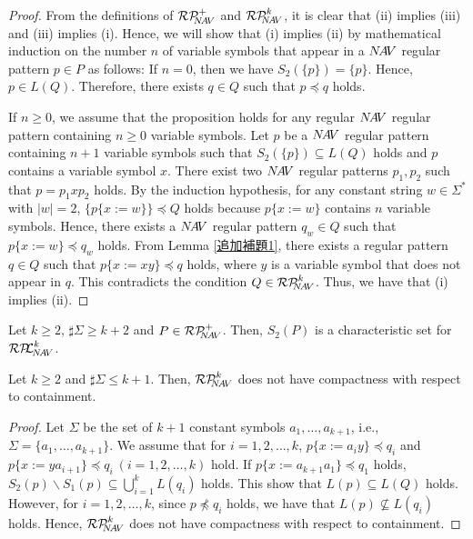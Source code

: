 \begin{proof}
From the definitions of $\mathcal{RP}^{+}_{\!\!\!N\!A\!V}$ and $\mathcal{RP}^{k}_{\!\!\!N\!A\!V}$, it is clear that (ii) implies (iii)  and  (iii) implies (i).
Hence, we will show that (i) implies (ii) 
by mathematical induction on the number $n$ of variable symbols that appear in a $N\!A\!V$ regular pattern $p\in P$ as follows:
If $n=0$, then we have $S_{2}(\{p\})= \{ p \}$.
Hence, $p \in L(Q)$.
Therefore, there exists $q \in Q$ such that $p \preceq q$ holds.

If $n \ge 0$, we assume that the proposition holds for any regular $N\!A\!V$ regular pattern containing $n \ge 0$ variable symbols.
Let $p$ be a $N\!A\!V$ regular pattern containing $n+1$ variable symbols such that $S_{2}(\{p\}) \subseteq L(Q)$ holds and $p$ contains a variable symbol $x$.
There exist two $N\!A\!V$ regular patterns $p_{1},p_{2}$ such that $p=p_{1}xp_{2}$ holds.
By the induction hypothesis, for any constant string $w\in \Sigma^{\ast}$ with $|w|=2$, $\{p\{x:=w\}\}\preceq Q$ holds because $p\{x:=w\}$ contains $n$ variable symbols.
Hence, there exists a $N\!A\!V$ regular pattern $q_{w} \in Q$ such that $p \{ x:=w \} \preceq q_{w}$ holds.
From Lemma \ref{追加補題1}, there exists a regular pattern $q \in Q$ such that $p \{ x:=xy \} \preceq q$ holds, where $y$ is a variable symbol that does not appear in $q$.
This contradicts the condition $Q \in \mathcal{RP}^{k}_{\!\!\!N\!A\!V}$.
Thus, we have that (i) implies (ii).
\end{proof}

\begin{col}
Let $k\ge 2$, $\sharp\Sigma \ge k+2$ and $P \in \mathcal{RP}^{+}_{\!\!\!N\!A\!V}$.
Then, $S_{2}(P)$ is a characteristic set for $\mathcal{RP\!\!L}^{k}_{\!N\!A\!V}$.%
\end{col}

\begin{lem}\label{Case_k+2}\label{k+2のとき}
Let $k\ge 2$ and $\sharp\Sigma \le k+1$.
Then, $\mathcal{RP}^{k}_{\!\!\!N\!A\!V}$ does not have compactness with respect to containment.
\end{lem}
\begin{proof}
Let $\Sigma$ be the set of $k+1$ constant symbols $a_{1}, \ldots , a_{k+1}$, i.e., $\Sigma = \{ a_{1}, \ldots , a_{k+1} \}$.
We assume that for $i=1,2,\ldots,k$, $p \{ x := a_{i}y \} \preceq q_{i}$ and $p \{ x := ya_{i+1} \} \preceq q_{i}~(i=1,2, \ldots ,k)$ hold.
If $p \{ x:= a_{k+1}a_{1} \} \preceq q_{1}$ holds, $S_{2}(p) \backslash S_{1}(p) \subseteq \bigcup^{k}_{i=1} L(q_{i})$ holds.
This show that $L(p) \subseteq L(Q)$ holds.
However, for $i=1,2,\ldots,k$, since $p \not \preceq q_{i}$ holds, we have that $L(p) \not \subseteq L(q_{i})$ holds.
Hence, $\mathcal{RP}^{k}_{\!\!\!N\!A\!V}$ does not have compactness with respect to containment.
\end{proof}

